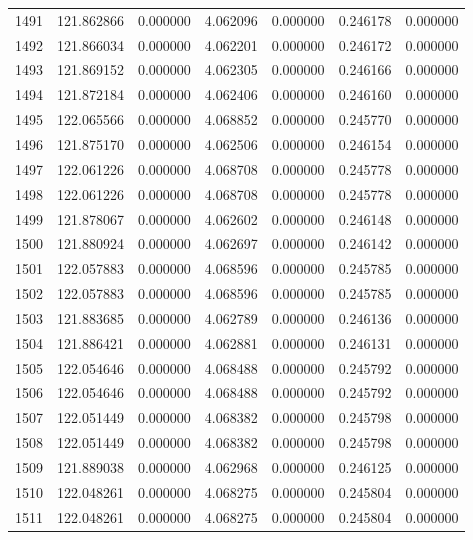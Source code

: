 \begin{tabular}{rrrrrrr}
1491 & 121.862866 &    0.000000 &  4.062096 &   0.000000 &   0.246178 &  0.000000 \\
1492 & 121.866034 &    0.000000 &  4.062201 &   0.000000 &   0.246172 &  0.000000 \\
1493 & 121.869152 &    0.000000 &  4.062305 &   0.000000 &   0.246166 &  0.000000 \\
1494 & 121.872184 &    0.000000 &  4.062406 &   0.000000 &   0.246160 &  0.000000 \\
1495 & 122.065566 &    0.000000 &  4.068852 &   0.000000 &   0.245770 &  0.000000 \\
1496 & 121.875170 &    0.000000 &  4.062506 &   0.000000 &   0.246154 &  0.000000 \\
1497 & 122.061226 &    0.000000 &  4.068708 &   0.000000 &   0.245778 &  0.000000 \\
1498 & 122.061226 &    0.000000 &  4.068708 &   0.000000 &   0.245778 &  0.000000 \\
1499 & 121.878067 &    0.000000 &  4.062602 &   0.000000 &   0.246148 &  0.000000 \\
1500 & 121.880924 &    0.000000 &  4.062697 &   0.000000 &   0.246142 &  0.000000 \\
1501 & 122.057883 &    0.000000 &  4.068596 &   0.000000 &   0.245785 &  0.000000 \\
1502 & 122.057883 &    0.000000 &  4.068596 &   0.000000 &   0.245785 &  0.000000 \\
1503 & 121.883685 &    0.000000 &  4.062789 &   0.000000 &   0.246136 &  0.000000 \\
1504 & 121.886421 &    0.000000 &  4.062881 &   0.000000 &   0.246131 &  0.000000 \\
1505 & 122.054646 &    0.000000 &  4.068488 &   0.000000 &   0.245792 &  0.000000 \\
1506 & 122.054646 &    0.000000 &  4.068488 &   0.000000 &   0.245792 &  0.000000 \\
1507 & 122.051449 &    0.000000 &  4.068382 &   0.000000 &   0.245798 &  0.000000 \\
1508 & 122.051449 &    0.000000 &  4.068382 &   0.000000 &   0.245798 &  0.000000 \\
1509 & 121.889038 &    0.000000 &  4.062968 &   0.000000 &   0.246125 &  0.000000 \\
1510 & 122.048261 &    0.000000 &  4.068275 &   0.000000 &   0.245804 &  0.000000 \\
1511 & 122.048261 &    0.000000 &  4.068275 &   0.000000 &   0.245804 &  0.000000 \\

\end{tabular}
